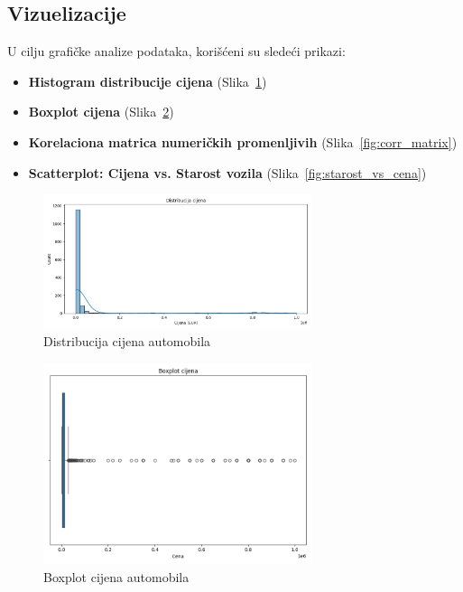 \documentclass[a4paper,12pt]{article}
\begin{document}
\subsection{Vizuelizacije}

U cilju grafičke analize podataka, korišćeni su sledeći prikazi:

\begin{itemize}
    \item \textbf{Histogram distribucije cijena} (Slika~\ref{fig:hist_cena})
    \item \textbf{Boxplot cijena} (Slika~\ref{fig:box_cena})
    \item \textbf{Korelaciona matrica numeričkih promenljivih} (Slika~\ref{fig:corr_matrix})
    \item \textbf{Scatterplot: Cijena vs. Starost vozila} (Slika~\ref{fig:starost_vs_cena})
\end{itemize}

\begin{figure}[H]
    \centering
    \includegraphics[width=0.7\textwidth]{hist_cena.png}
    \caption{Distribucija cijena automobila}
    \label{fig:hist_cena}
\end{figure}

\begin{figure}[H]
    \centering
    \includegraphics[width=0.7\textwidth]{box_cena.png}
    \caption{Boxplot cijena automobila}
    \label{fig:box_cena}
\end{figure}
\end{document}
